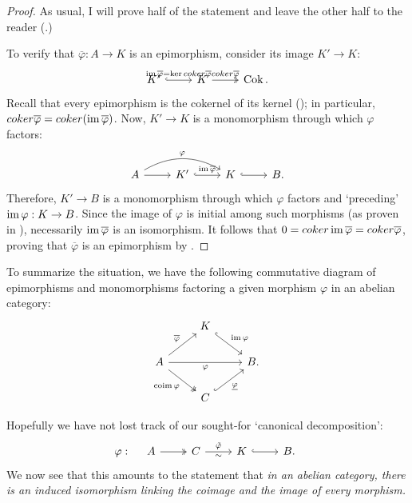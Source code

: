 \begin{proof}
  As usual, I will prove half of the statement and leave the other
  half to the reader (.)

  To verify that $\overline{\varphi} : A \to K$ is an epimorphism,
  consider its image $K' \to K$:
  \[\begin{tikzcd}
      K' \arrow[r, hook, "\image\overline{\varphi} =
      \ker\coker\overline{\varphi}"] & K \arrow[r, two heads,
      "\coker\overline{\varphi}"] & \operatorname{Cok}.
    \end{tikzcd}\] Recall that every epimorphism is the cokernel of
  its kernel (); in particular,
  $coker\overline{\varphi} = coker(\operatorname{im}\overline{\varphi})$.  Now,
  $K' \to K$ is a monomorphism through which $\varphi$ factors:
  \[\begin{tikzcd}
      A \arrow[r] \arrow[rr, bend left, "\varphi"] & K' \arrow[r,
      hook, "\image\overline{\varphi}"] & K \arrow[r, hook] & B.
    \end{tikzcd}\] Therefore, $K' \to B$ is a monomorphism through
  which $\varphi$ factors and `preceding' $\operatorname{im}\varphi : K \to
  B$. Since the image of $\varphi$ is initial among such morphisms (as
  proven in ), necessarily
  $\operatorname{im}\overline{\varphi}$ is an isomorphism. It follows that
  $0 = coker\operatorname{im}\overline{\varphi} = coker\overline{\varphi}$,
  proving that $\overline{\varphi}$ is an epimorphism by
  .
\end{proof}
To summarize the situation, we have the following commutative diagram
of epimorphisms and monomorphisms factoring a given morphism $\varphi$
in an abelian category:
\[\begin{tikzcd}
    & K \arrow[dr, hook, "\image\varphi"] & \\
    A \arrow[ur, "\overline{\varphi}"] \arrow[rr, "\varphi"']
    \arrow[dr, two heads, "\operatorname{coim}\varphi"'] & & B. \\
    & C \arrow[ur, hook, "\underline{\varphi}"'] &
  \end{tikzcd}\]

Hopefully we have not lost track of our sought-for `canonical
decomposition':
\[
  \varphi : \quad
  \begin{tikzcd}
    A \arrow[r, two heads] & C \arrow[r, "\tilde{\varphi}", "\sim"'] &
    K \arrow[r, hook] & B.
  \end{tikzcd}
\]
We now see that this amounts to the statement that \emph{in an abelian
  category, there is an induced isomorphism linking the coimage and
  the image of every morphism.}

